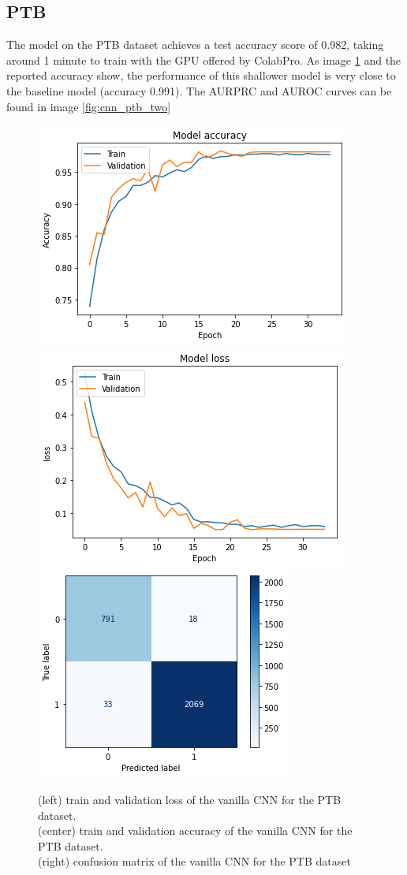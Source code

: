 \documentclass[11pt]{scrartcl}
\begin{document}
\subsection{PTB}
The model on the PTB dataset achieves a test accuracy score of 0.982, taking around 1 minute to train with the GPU offered by ColabPro. 
As image \ref{fig:cnn_ptb_three} and the reported accuracy show, the performance of this shallower model is very close to the baseline model (accuracy 0.991).
The AURPRC and AUROC curves can be found in image \ref{fig:cnn_ptb_two}
\begin{figure}[htp]
\centering
\includegraphics[width=.30\textwidth]{../models_performance_graphs/ptb/cnn_ptb_accuracy.png}\hfill
\includegraphics[width=.30\textwidth]{../models_performance_graphs/ptb/cnn_ptb_loss.png}\hfill
\includegraphics[width=.30\textwidth]{../models_performance_graphs/ptb/cnn_ptb_confusion.png}\hfill
\caption{(left) train and validation loss of the vanilla CNN for the PTB dataset. \\ (center) train and validation accuracy of the vanilla CNN for the PTB dataset. \\(right) confusion matrix of the vanilla CNN for the PTB dataset}
\label{fig:cnn_ptb_three}
\end{figure}
\end{document}
